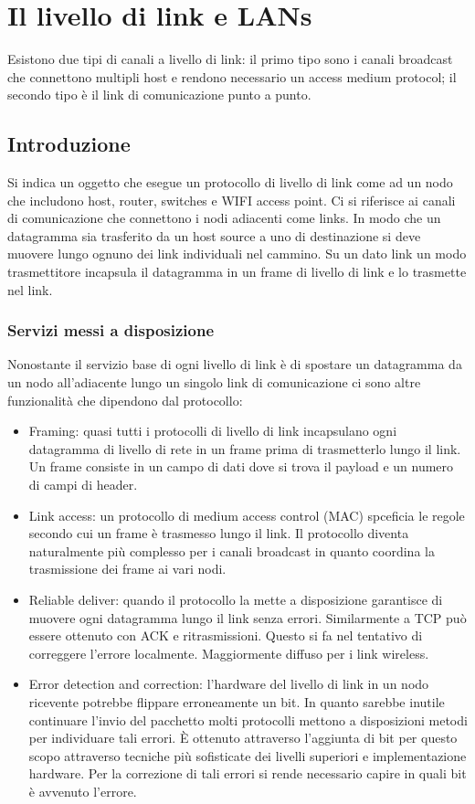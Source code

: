 \chapter{Il livello di link e LANs}
Esistono due tipi di canali a livello di link: il primo tipo sono i canali broadcast che connettono multipli host e rendono necessario un access medium protocol; il secondo tipo \`e il link di comunicazione punto a 
punto.
\section{Introduzione}
Si indica un oggetto che esegue un protocollo di livello di link come ad un nodo che includono host, router, switches e WIFI access point. Ci si riferisce ai canali di comunicazione che connettono i nodi adiacenti 
come links. In modo che un datagramma sia trasferito da un host source a uno di destinazione si deve muovere lungo ognuno dei link individuali nel cammino. Su un dato link un modo trasmettitore incapsula
il datagramma in un frame di livello di link e lo trasmette nel link. 
\subsection{Servizi messi a disposizione}
Nonostante il servizio base di ogni livello di link \`e di spostare un datagramma da un nodo all'adiacente lungo un singolo link di comunicazione ci sono altre funzionalit\`a che dipendono dal protocollo:
\begin{itemize}
\item Framing: quasi tutti i protocolli di livello di link incapsulano ogni datagramma di livello di rete in un frame prima di trasmetterlo lungo il link. Un frame consiste in un campo di dati dove si trova il payload e 
un numero di campi di header. 
\item Link access: un protocollo di medium access control (MAC) spceficia le regole secondo cui un frame \`e trasmesso lungo il link. Il protocollo diventa naturalmente pi\`u complesso per i canali broadcast in 
quanto coordina la trasmissione dei frame ai vari nodi.
\item Reliable deliver: quando il protocollo la mette a disposizione garantisce di muovere ogni datagramma lungo il link senza errori.  Similarmente  a TCP pu\`o essere ottenuto con ACK e ritrasmissioni. Questo
si fa nel tentativo di correggere l'errore localmente. Maggiormente diffuso per i link wireless.
\item Error detection and correction: l'hardware del livello di link in un nodo ricevente potrebbe flippare erroneamente un bit. In quanto sarebbe inutile continuare l'invio del pacchetto molti protocolli mettono
a disposizioni metodi per individuare tali errori. \`E ottenuto attraverso l'aggiunta di bit per questo scopo attraverso tecniche pi\`u sofisticate dei livelli superiori e implementazione hardware. Per la correzione di
tali errori si rende necessario capire in quali bit \`e avvenuto l'errore.  
\end{itemize}
